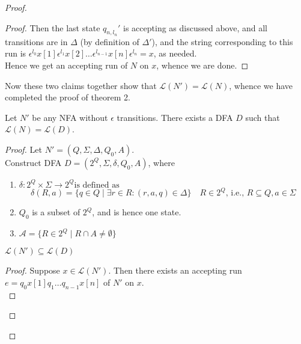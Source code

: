 \documentclass[a4paper]{article}
\newcommand{\mc}{\mathcal}
\begin{document}
\begin{proof}
\begin{proof}
        Then the last state $q_{n, l_n}'$ is accepting as discussed above, and all transitions are in $\Delta$ (by definition of $\Delta'$), and the string corresponding to this run is
        $\epsilon^{l_0} x[1] \epsilon^{l_1} x[2] \ldots \epsilon^{l_{n-1}} x[n] \epsilon^{l_n} = x$, as needed.\\

        Hence we get an accepting run of $N$ on $x$, whence we are done.

    \end{proof}


    Now these two claims together show that $\mc{L}(N') = \mc{L}(N)$, whence we have completed the proof of theorem 2.\\



    \begin{theorem}
        Let $N'$ be any NFA without $\epsilon$ transitions. There exists a DFA $D$ such that $\mc{L}(N) = \mc{L}(D)$.
    \end{theorem}


    \begin{proof}
        Let $N' = (Q, \Sigma, \Delta, Q_0, A)$.\\

        Construct DFA $D = (2^Q, \Sigma, \delta, Q_0, A)$, where

        \begin{enumerate}
            \item $\delta : 2^Q \times \Sigma \to 2^Q  \text{is defined as}$\\
                $$\delta(R, a) = \{q \in Q \mid \exists r \in R : (r, a, q) \in \Delta\} \quad R \in 2^Q \text{, i.e., }R \subseteq Q, a \in \Sigma$$

            \item $Q_0$ is a subset of $2^Q$, and is hence one state.

            \item $\mc{A} = \{R \in 2^Q \mid R \cap A \ne \emptyset\}$
        \end{enumerate}

        \begin{claim}
            $\mc{L}(N') \subseteq \mc{L}(D)$
        \end{claim}


        \begin{proof}
            Suppose $x \in \mc{L}(N')$. Then there exists an accepting run $e = q_0 x[1] q_1 \ldots q_{n-1} x[n]$ of $N'$ on $x$.\\


\end{proof}
\end{proof}
\end{proof}
\end{document}
